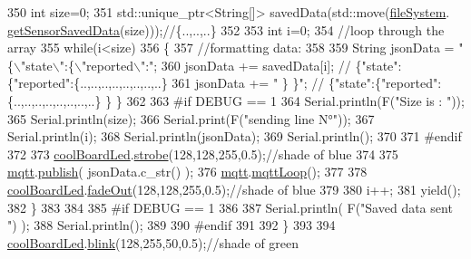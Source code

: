 \begin{DoxyCode}
350         \textcolor{keywordtype}{int} size=0;
351         std::unique\_ptr<String[]> savedData(std::move(\hyperlink{class_cool_board_a42c2586fbb13ff7f06538e9284e8538d}{fileSystem}.
      \hyperlink{class_cool_file_system_a3223ffff4266a6300988fab956d6b4b2}{getSensorSavedData}(size)));\textcolor{comment}{//\{..,..,..\}}
352 
353         \textcolor{keywordtype}{int} i=0;
354         \textcolor{comment}{//loop through the array}
355         \textcolor{keywordflow}{while}(i<size)
356         \{
357             \textcolor{comment}{//formatting data:}
358         
359             String jsonData = \textcolor{stringliteral}{"\{\(\backslash\)"state\(\backslash\)":\{\(\backslash\)"reported\(\backslash\)":"};
360             jsonData += savedData[i]; \textcolor{comment}{// \{"state":\{"reported":\{..,..,..,..,..,..,..,..\}}
361             jsonData += \textcolor{stringliteral}{" \} \}"}; \textcolor{comment}{// \{"state":\{"reported":\{..,..,..,..,..,..,..,..\}  \} \}}
362 
363 \textcolor{preprocessor}{        #if DEBUG == 1 }
364             Serial.println(F(\textcolor{stringliteral}{"Size is : "}));
365             Serial.println(size);
366             Serial.print(F(\textcolor{stringliteral}{"sending line N°"}));
367             Serial.println(i);
368             Serial.println(jsonData);
369             Serial.println();
370 
371 \textcolor{preprocessor}{        #endif}
372 
373             \hyperlink{class_cool_board_a1b1d3c684a5baa56b08486e192fd8e97}{coolBoardLed}.\hyperlink{class_cool_board_led_ad5f0de4c628cbfbf49896042831c64ad}{strobe}(128,128,255,0.5);\textcolor{comment}{//shade of blue}
374         
375             \hyperlink{class_cool_board_a2399f44d7c23c1149a335cb3b46d90f1}{mqtt}.\hyperlink{class_cool_m_q_t_t_ace977b3e90ab14b1199fe5c4fb0a13ec}{publish}( jsonData.c\_str() );
376             \hyperlink{class_cool_board_a2399f44d7c23c1149a335cb3b46d90f1}{mqtt}.\hyperlink{class_cool_m_q_t_t_aa5eaae967b562b62cbcf2b8d81f6e5d5}{mqttLoop}();
377         
378             \hyperlink{class_cool_board_a1b1d3c684a5baa56b08486e192fd8e97}{coolBoardLed}.\hyperlink{class_cool_board_led_a93d545679237e8cc858324367149775c}{fadeOut}(128,128,255,0.5);\textcolor{comment}{//shade of blue}
379             
380             i++;
381             yield();
382         \}       
383 
384 
385 \textcolor{preprocessor}{    #if DEBUG == 1}
386 
387         Serial.println( F(\textcolor{stringliteral}{"Saved data sent "}) );
388         Serial.println();
389     
390 \textcolor{preprocessor}{    #endif}
391 
392     \}
393 
394     \hyperlink{class_cool_board_a1b1d3c684a5baa56b08486e192fd8e97}{coolBoardLed}.\hyperlink{class_cool_board_led_a96e1ea13003eee34c9dbcef340404426}{blink}(128,255,50,0.5);\textcolor{comment}{//shade of green}

\end{DoxyCode}
